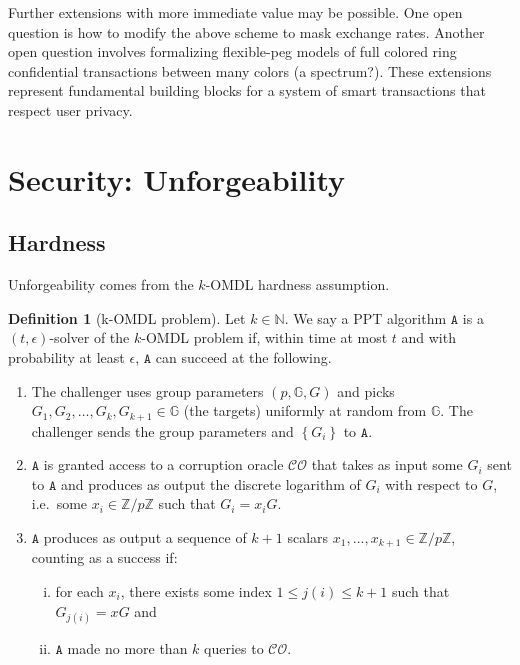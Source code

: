 \documentclass{article}
\theoremstyle{plain}
\theoremstyle{definition}
\newtheorem{defn}{Definition}[section]
\begin{document}
Further extensions with more immediate value may be possible. One open question is how to modify the above scheme to mask exchange rates. Another open question involves formalizing flexible-peg models of full colored ring confidential transactions between many colors (a spectrum?). These extensions represent fundamental building blocks for a system of smart transactions that respect user privacy. 


\appendix


\section{Security: Unforgeability}

\subsection{Hardness}

Unforgeability comes from the $k$-OMDL hardness assumption. 

\begin{defn}[k-OMDL problem]
Let $k \in \mathbb{N}$. We say a PPT algorithm $\texttt{A}$ is a $(t, \epsilon)$-solver of the $k$-OMDL problem if, within time at most $t$ and with probability at least $\epsilon$, $\texttt{A}$ can succeed at the following.

\begin{enumerate}
\item The challenger uses group parameters $(p, \mathbb{G}, G)$ and picks $G_1, G_2, \ldots, G_{k}, G_{k+1} \in \mathbb{G}$ (the targets) uniformly at random from $\mathbb{G}$. The challenger sends the group parameters and $\left\{G_i\right\}$ to $\texttt{A}$.

\item $\texttt{A}$ is granted access to a corruption oracle $\mathcal{CO}$ that takes as input some $G_i$ sent to $\texttt{A}$ and produces as output the discrete logarithm of $G_i$ with respect to $G$, i.e.\ some $x_i \in \mathbb{Z}/p\mathbb{Z}$ such that $G_i = x_i G$.

\item $\texttt{A}$ produces as output a sequence of $k+1$ scalars $x_1, \ldots, x_{k+1} \in \mathbb{Z}/p\mathbb{Z}$, counting as a success if:
\begin{enumerate}[(i)]
\item for each $x_i$, there exists some index $1 \leq j(i) \leq k+1$ such that $G_{j(i)} = xG$ and
\item $\texttt{A}$ made no more than $k$ queries to $\mathcal{CO}$. 
\end{enumerate}
\end{enumerate}
\end{defn}
\end{document}
